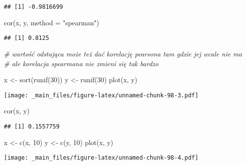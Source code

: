 \documentclass[
]{book}
\newenvironment{Shaded}{\begin{snugshade}}{\end{snugshade}}
\newcommand{\AttributeTok}[1]{\textcolor[rgb]{0.77,0.63,0.00}{#1}}
\newcommand{\CommentTok}[1]{\textcolor[rgb]{0.56,0.35,0.01}{\textit{#1}}}
\newcommand{\DecValTok}[1]{\textcolor[rgb]{0.00,0.00,0.81}{#1}}
\newcommand{\FunctionTok}[1]{\textcolor[rgb]{0.00,0.00,0.00}{#1}}
\newcommand{\NormalTok}[1]{#1}
\newcommand{\OtherTok}[1]{\textcolor[rgb]{0.56,0.35,0.01}{#1}}
\newcommand{\StringTok}[1]{\textcolor[rgb]{0.31,0.60,0.02}{#1}}
\begin{document}
\begin{verbatim}
## [1] -0.9816699
\end{verbatim}

\begin{Shaded}
\begin{Highlighting}[]
\FunctionTok{cor}\NormalTok{(x, y, }\AttributeTok{method =} \StringTok{"spearman"}\NormalTok{)}
\end{Highlighting}
\end{Shaded}

\begin{verbatim}
## [1] 0.8125
\end{verbatim}

\begin{Shaded}
\begin{Highlighting}[]
\CommentTok{\# wartość odstająca może też dać korelację pearsona tam gdzie jej wcale nie ma}
\CommentTok{\# ale korelacja spearmana nie zmieni się tak bardzo}

\NormalTok{x }\OtherTok{\textless{}{-}} \FunctionTok{sort}\NormalTok{(}\FunctionTok{runif}\NormalTok{(}\DecValTok{30}\NormalTok{))}
\NormalTok{y }\OtherTok{\textless{}{-}} \FunctionTok{runif}\NormalTok{(}\DecValTok{30}\NormalTok{)}
\FunctionTok{plot}\NormalTok{(x, y)}
\end{Highlighting}
\end{Shaded}

\texttt{[image: \_main\_files/figure-latex/unnamed-chunk-98-3.pdf]}

\begin{Shaded}
\begin{Highlighting}[]
\FunctionTok{cor}\NormalTok{(x, y)}
\end{Highlighting}
\end{Shaded}

\begin{verbatim}
## [1] 0.1557759
\end{verbatim}

\begin{Shaded}
\begin{Highlighting}[]
\NormalTok{x }\OtherTok{\textless{}{-}} \FunctionTok{c}\NormalTok{(x, }\DecValTok{10}\NormalTok{)}
\NormalTok{y }\OtherTok{\textless{}{-}} \FunctionTok{c}\NormalTok{(y, }\DecValTok{10}\NormalTok{)}
\FunctionTok{plot}\NormalTok{(x, y)}
\end{Highlighting}
\end{Shaded}

\texttt{[image: \_main\_files/figure-latex/unnamed-chunk-98-4.pdf]}
\end{document}

